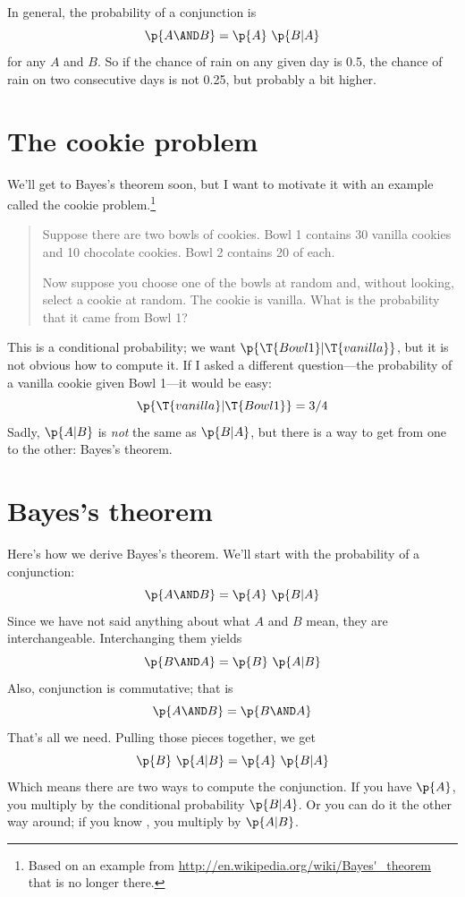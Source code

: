 \documentclass[12pt]{book}
\theoremstyle{exercise}
\begin{document}
In general, the probability of a conjunction is
%
\[ \p{A \AND B} = \p{A}~\p{B|A} \]
%
for any $A$ and $B$.  So if the chance of rain on any given day
is 0.5, the chance of rain on two consecutive days is not
0.25, but probably a bit higher.


\section{The cookie problem}
\label{cookie}


We'll get to Bayes's theorem soon, but I want to motivate it with an
example called the cookie problem.\footnote{Based on an example from
  \url{http://en.wikipedia.org/wiki/Bayes'_theorem} that is no longer
  there.}  
  
\begin{quote}
Suppose there are two bowls of cookies.  
Bowl 1 contains 30 vanilla cookies and 10 chocolate cookies.
Bowl 2 contains 20 of each.

Now suppose you choose one of the bowls at random and, without
looking, select a cookie at random.  
The cookie is vanilla.  
What is the probability that it came from Bowl 1?
\end{quote}

This is a conditional probability; we want $\p{\T{Bowl 1} |
  \T{vanilla}}$, but it is not obvious how to compute it.  If I asked a
different question---the probability of a vanilla cookie given Bowl
1---it would be easy:
%
\[ \p{\T{vanilla} | \T{Bowl 1}} = 3/4 \]
%
Sadly, $\p{A|B}$ is {\em not} the same as $\p{B|A}$, but there
is a way to get from one to the other: Bayes's theorem.


\section{Bayes's theorem}


Here's how we derive Bayes's theorem.
We'll start with the probability of a conjunction:
%
\[ \p{A \AND B} = \p{A}~\p{B|A} \]
%
Since we have not said anything about what $A$ and $B$ mean, they
are interchangeable.  
Interchanging them yields
%
\[ \p{B \AND A} = \p{B}~\p{A|B} \]
%
Also, conjunction is commutative; that is
%
\[ \p{A \AND B} = \p{B \AND A} \]
%
That's all we need.  Pulling those pieces together, we get
%
\[ \p{B}~\p{A|B} = \p{A}~\p{B|A} \]
%
Which means there are two ways to compute the conjunction.
If you have $\p{A}$, you multiply by the conditional
probability $\p{B|A}$.  
Or you can do it the other way around; if you
know , you multiply by $\p{A|B}$.
\end{document}
